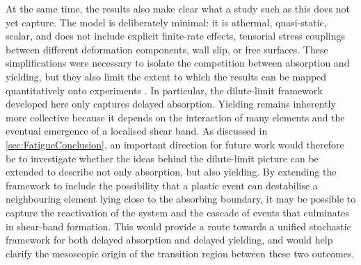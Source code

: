 \documentclass[asymmetricmargins]{library/duthesis}%
\begin{document}

At the same time, the results also make clear what a study such as this does not yet capture. The model is deliberately minimal: it is athermal, quasi-static, scalar, and does not include explicit finite-rate effects, tensorial stress couplings between different deformation components, wall slip, or free surfaces. These simplifications were necessary to isolate the competition between absorption and yielding, but they also limit the extent to which the results can be mapped quantitatively onto experiments \cite{pineChaosThresholdIrreversibility2005,Cort2008,tapadiaBandingEntangledPolymer2006,Koumakis2011,Petekidis2004,knowltonMicroscopicViewYielding2014}. In particular, the dilute-limit framework developed here only captures delayed absorption. Yielding remains inherently more collective because it depends on the interaction of many elements and the eventual emergence of a localised shear band. As discussed in \cref{sec:FatigueConclusion}, an important direction for future work would therefore be to investigate whether the ideas behind the dilute-limit picture can be extended to describe not only absorption, but also yielding. By extending the framework to include the possibility that a plastic event can destabilise a neighbouring element lying close to the absorbing boundary, it may be possible to capture the reactivation of the system and the cascade of events that culminates in shear-band formation. This would provide a route towards a unified stochastic framework for both delayed absorption and delayed yielding, and would help clarify the mesoscopic origin of the transition region between these two outcomes.
\end{document}
